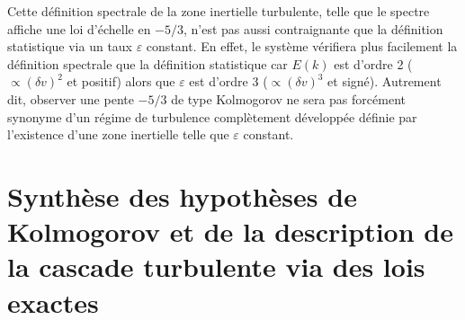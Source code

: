 Cette définition spectrale de la zone inertielle turbulente, telle que le spectre affiche une loi d'échelle en $-5/3$, n'est pas aussi contraignante que la définition statistique via un taux $\varepsilon$ constant. En effet, le système vérifiera plus facilement la définition spectrale que la définition statistique car $E(k)$ est d'ordre 2 ($\propto (\delta v)^2$ et positif) alors que $\varepsilon$ est d'ordre 3 ($\propto (\delta v)^3$ et signé). Autrement dit, observer une pente $-5/3$ de type Kolmogorov ne sera pas forcément synonyme d'un régime de turbulence complètement développée définie par l'existence d'une zone inertielle telle que $\varepsilon$ constant. 

\section{Synthèse des hypothèses de Kolmogorov et de la description de la cascade turbulente via des lois exactes}
\label{synt-01}
